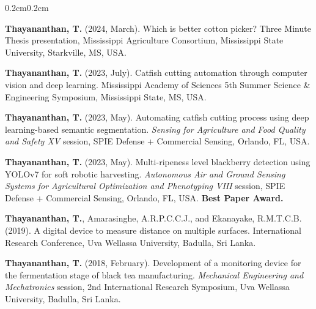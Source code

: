 \documentclass[10pt, letterpaper]{article}
\newcommand{\textbfr}[1]{\textbf{#1}}
\newenvironment{onecolentry}{%
    \begin{adjustwidth}{0.2cm}{0.2cm}
}{\end{adjustwidth}}
\newenvironment{pres}{%
  \begin{enumerate}[label={[P\arabic*]}, leftmargin=1.15cm, labelsep=0.2cm,
                    topsep=0.08cm, parsep=0.08cm, partopsep=0pt, itemsep=0pt]
}{\end{enumerate}}
\begin{document}
\begin{onecolentry}
\begin{pres}
    \item \textbfr{Thayananthan, T.} (2024, March). Which is better cotton picker?
    Three Minute Thesis presentation, Mississippi Agriculture Consortium,
    Mississippi State University, Starkville, MS, USA.

    \item \textbfr{Thayananthan, T.} (2023, July). Catfish cutting automation through
    computer vision and deep learning. Mississippi Academy of Sciences 5th Summer
    Science \& Engineering Symposium, Mississippi State, MS, USA.

    \item \textbfr{Thayananthan, T.} (2023, May). Automating catfish cutting process
    using deep learning-based semantic segmentation. \emph{Sensing for Agriculture
    and Food Quality and Safety XV} session, SPIE Defense + Commercial Sensing,
    Orlando, FL, USA.

    \item \textbfr{Thayananthan, T.} (2023, May). Multi-ripeness level blackberry
    detection using YOLOv7 for soft robotic harvesting. \emph{Autonomous Air and
    Ground Sensing Systems for Agricultural Optimization and Phenotyping VIII}
    session, SPIE Defense + Commercial Sensing, Orlando, FL, USA.
    \textbf{Best Paper Award.}

    \item \textbfr{Thayananthan, T.}, Amarasinghe, A.R.P.C.C.J., and
    Ekanayake, R.M.T.C.B. (2019). A digital device to measure distance on multiple
    surfaces. International Research Conference, Uva Wellassa University,
    Badulla, Sri Lanka.

    \item \textbfr{Thayananthan, T.} (2018, February). Development of a monitoring
    device for the fermentation stage of black tea manufacturing.
    \emph{Mechanical Engineering and Mechatronics} session, 2nd International
    Research Symposium, Uva Wellassa University, Badulla, Sri Lanka.
\end{pres}
\end{onecolentry}
\vspace{0.10cm}

\end{document}
